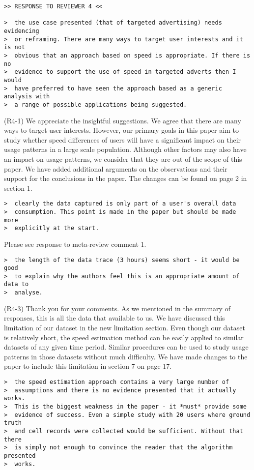 \newpage
\begin{verbatim}
>> RESPONSE TO REVIEWER 4 <<

>  the use case presented (that of targeted advertising) needs evidencing
>  or reframing. There are many ways to target user interests and it is not
>  obvious that an approach based on speed is appropriate. If there is no
>  evidence to support the use of speed in targeted adverts then I would
>  have preferred to have seen the approach based as a generic analysis with
>  a range of possible applications being suggested.
\end{verbatim}

(R4-1) We appreciate the insightful suggestions. We agree that there are many ways to target user interests. However, our primary goals in this paper aim to study whether speed differences of users will have a significant impact on their usage patterns in a large scale population. Although other factors may also have an impact on usage patterns, we consider that they are out of the scope of this paper. We have added additional arguments on the observations and their support for the conclusions in the paper. The changes can be found on page 2 in section 1. 

\begin{verbatim}
>  clearly the data captured is only part of a user's overall data
>  consumption. This point is made in the paper but should be made more
>  explicitly at the start.
\end{verbatim}

Please see response to meta-review comment 1.

\begin{verbatim}
>  the length of the data trace (3 hours) seems short - it would be good
>  to explain why the authors feel this is an appropriate amount of data to
>  analyse.
\end{verbatim}

(R4-3) Thank you for your comments. As we mentioned in the summary of responses, this is all the data that available to us. We have discussed this limitation of our dataset in the new limitation section. Even though our dataset is relatively short, the speed estimation method can be easily applied to similar datasets of any given time period. Similar procedures can be used to study usage patterns in those datasets without much difficulty. We have made changes to the paper to include this limitation in section 7 on page 17. 
 
\begin{verbatim}
>  the speed estimation approach contains a very large number of
>  assumptions and there is no evidence presented that it actually works.
>  This is the biggest weakness in the paper - it *must* provide some
>  evidence of success. Even a simple study with 20 users where ground truth
>  and cell records were collected would be sufficient. Without that there
>  is simply not enough to convince the reader that the algorithm presented
>  works.
\end{verbatim}

